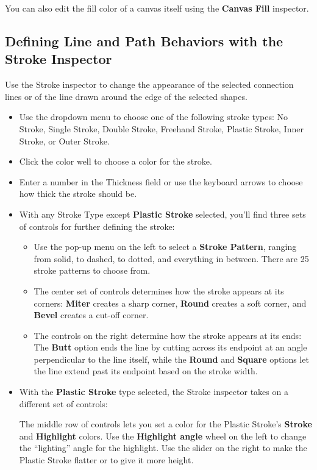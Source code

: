 \documentclass[../main.tex]{subfiles}
\begin{document}
You can also edit the fill color of a canvas itself using the \textbf{Canvas Fill} inspector.

\subsection{Defining Line and Path Behaviors with the Stroke Inspector}

Use the Stroke inspector to change the appearance of the selected connection lines or of the
line drawn around the edge of the selected shapes.


\begin{itemize}
  \item Use the dropdown menu to choose one of the following stroke types: No Stroke, Single
    Stroke, Double Stroke, Freehand Stroke, Plastic Stroke, Inner Stroke, or Outer Stroke.
  \item Click the color well to choose a color for the stroke.
  \item Enter a number in the Thickness field or use the keyboard arrows to choose how thick the
    stroke should be.
  \item With any Stroke Type except \textbf{Plastic Stroke} selected, you'll find three sets of
    controls for further defining the stroke:


    \begin{itemize}
      \item Use the pop-up menu on the left to select a \textbf{Stroke Pattern}, ranging from
        solid, to dashed, to dotted, and everything in between. There are 25 stroke patterns to
        choose from.
      \item The center set of controls determines how the stroke appears at its corners:
        \textbf{Miter} creates a sharp corner, \textbf{Round} creates a soft corner, and
        \textbf{Bevel} creates a cut-off corner.
      \item The controls on the right determine how the stroke appears at its ends: The
        \textbf{Butt} option ends the line by cutting across its endpoint at an angle
        perpendicular to the line itself, while the \textbf{Round} and \textbf{Square} options let
        the line extend past its endpoint based on the stroke width.
    \end{itemize}
  \item With the \textbf{Plastic Stroke} type selected, the Stroke inspector takes on a
    different set of controls:


    The middle row of controls lets you set a color for the Plastic Stroke's \textbf{Stroke} and
    \textbf{Highlight} colors. Use the \textbf{Highlight angle} wheel on the left to change the
    ``lighting'' angle for the highlight. Use the slider on the right to make the Plastic Stroke
    flatter or to give it more height.
\end{itemize}
\end{document}
